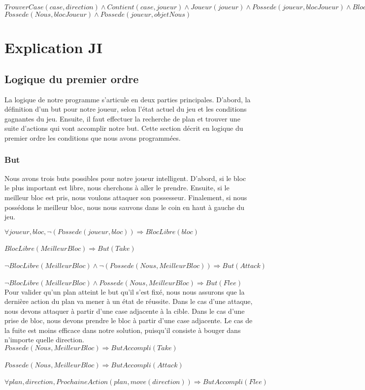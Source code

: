 \documentclass[12pt,letterpaper]{article}
\begin{document}
        {$TrouverCase(case, direction) \wedge Contient(case, joueur) \wedge Joueur(joueur) \wedge Possede(joueur, blocJoueur) \wedge Bloc(blocJoueur) \wedge Possede(Nous, objetNous)$}
        {$Possede(Nous, blocJoueur) \wedge Possede(joueur, objetNous)$}

\section{Explication JI}
\subsection{Logique du premier ordre} %
La logique de notre programme s'articule en deux parties principales. D'abord,
la définition d'un but pour notre joueur, selon l'état actuel du jeu et les
conditions gagnantes du jeu. Ensuite, il faut effectuer la recherche de plan
et trouver une suite d'actions qui vont accomplir notre but. Cette section
décrit en logique du premier ordre les conditions que nous avons programmées.
\subsubsection{But}
Nous avons trois buts possibles pour notre joueur intelligent. D'abord, si le
bloc le plus important est libre, nous cherchons à aller le prendre. Ensuite,
si le meilleur bloc est pris, nous voulons attaquer son possesseur. Finalement,
si nous possédons le meilleur bloc, nous nous sauvons dans le coin en haut à
gauche du jeu.

$\forall joueur, bloc, \neg(Possede(joueur, bloc)) \Rightarrow BlocLibre(bloc)$ \\
\\
$BlocLibre(MeilleurBloc) \Rightarrow But(Take)$ \\
\\
$\neg BlocLibre(MeilleurBloc) \wedge \neg (Possede(Nous, MeilleurBloc)) \Rightarrow But(Attack)$ \\
\\
$\neg BlocLibre(MeilleurBloc) \wedge Possede(Nous, MeilleurBloc) \Rightarrow But(Flee)$ \\

Pour valider qu'un plan atteint le but qu'il s'est fixé, nous nous assurons que
la dernière action du plan va mener à un état de réussite. Dans le cas d'une attaque,
nous devons attaquer à partir d'une case adjacente à la cible. Dans le cas d'une
prise de bloc, nous devons prendre le bloc à partir d'une case adjacente. Le cas de
la fuite est moins efficace dans notre solution, puisqu'il consiste à bouger dans
n'importe quelle direction.
\\
$Possede(Nous, MeilleurBloc) \Rightarrow ButAccompli(Take)$ \\
\\
$Possede(Nous, MeilleurBloc) \Rightarrow ButAccompli(Attack)$ \\
\\
$\forall plan, direction, ProchaineAction(plan, move(direction)) \Rightarrow ButAccompli(Flee)$\\
\end{document}
